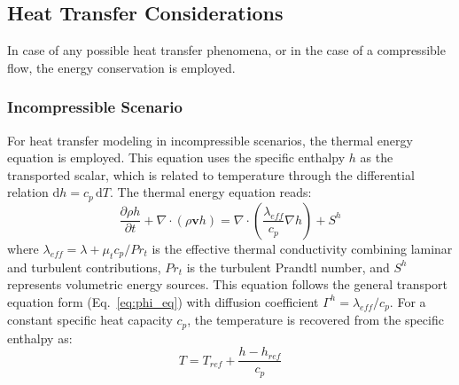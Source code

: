\documentclass[12pt]{extarticle}
\newcommand{\<}{\langle}
\renewcommand{\>}{\rangle}
\theoremstyle{definition}
\begin{document}
\subsection{Heat Transfer Considerations}
In case of any possible heat transfer phenomena, or in the case of a compressible flow, the energy conservation is employed.

\subsubsection{Incompressible Scenario}
For heat transfer modeling in incompressible scenarios, the thermal energy equation is employed. This equation uses the specific enthalpy $h$ as the transported scalar, which is related to temperature through the differential relation $\mathrm{d}h = c_p\,\mathrm{d}T$. The thermal energy equation reads:
\begin{equation}
    \frac{\partial \rho h}{\partial t} + \nabla \cdot (\rho \textbf{v} h) = \nabla \cdot \left(\frac{\lambda_{eff}}{c_p} \nabla h \right) + S^h \label{eq:ener_full_ter}
\end{equation}
where $\lambda_{eff} = \lambda + \mu_t c_p / Pr_t$ is the effective thermal conductivity combining laminar and turbulent contributions, $Pr_t$ is the turbulent Prandtl number, and $S^h$ represents volumetric energy sources. This equation follows the general transport equation form (Eq.~\ref{eq:phi_eq}) with diffusion coefficient $\Gamma^h = \lambda_{eff}/c_p$. For a constant specific heat capacity $c_p$, the temperature is recovered from the specific enthalpy as:
\begin{equation}
    T = T_{ref} + \frac{h - h_{ref}}{c_p} \label{eq:ener_full_ter_f2}
\end{equation}
\end{document}
